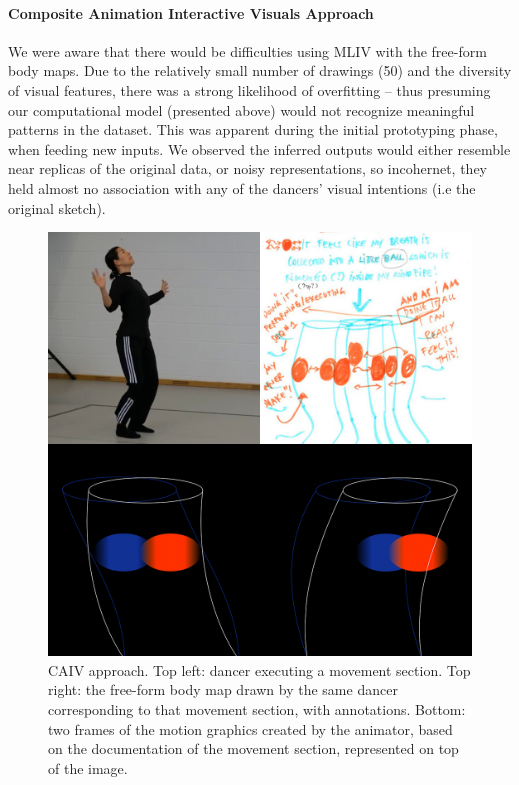 

\paragraph{Composite Animation Interactive Visuals Approach}

We were aware that there would be difficulties using MLIV with the free-form body maps. Due to the relatively small number of drawings (50) and the diversity of visual features, there was a strong likelihood of overfitting – thus presuming our computational model (presented above) would not recognize meaningful patterns in the dataset. This was apparent during the initial prototyping phase, when feeding new inputs. We observed the inferred outputs would either resemble near replicas of the original data, or noisy representations, so incohernet, they held almost no association with any of the dancers’ visual intentions (i.e the original sketch).

\begin{figure}[ht]
  \centering
  \includegraphics[width=0.65\linewidth]{Chapters/Figures/modi_dis/Stage1-animation.jpg}
  \caption[Composite Animation Approach]{CAIV approach. Top left: dancer executing a movement section. Top right: the free-form body map drawn by the same dancer corresponding to that movement section, with annotations. Bottom: two frames of the motion graphics created by the animator, based on the documentation of the movement section, represented on top of the image.}
    \label{fig:Stage1-animation}
\end{figure}


